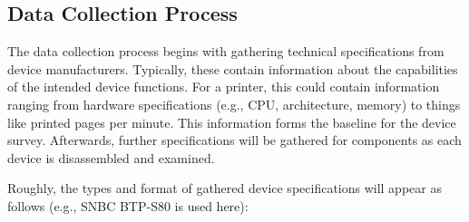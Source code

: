 \subsection{Data Collection Process} \label{datacollectionprocess}

The data collection process begins with gathering technical specifications from device manufacturers. Typically, these contain information about the capabilities of the intended device functions. For a printer, this could contain information ranging from hardware specifications (e.g., CPU, architecture, memory) to things like printed pages per minute. This information forms the baseline for the device survey. Afterwards, further specifications will be gathered for components as each device is disassembled and examined.

Roughly, the types and format of gathered device specifications will appear as follows (e.g., SNBC BTP-S80 is used here):

